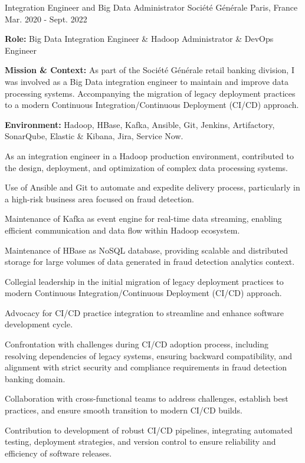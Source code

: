 \begin{cventries}
\cventry
{Integration Engineer and Big Data Administrator} %
{Société Générale} %
{Paris, France} %
{Mar. 2020 - Sept. 2022} %
{
  \begin{cvitems} %
    \item {\textbf{Role:} Big Data Integration Engineer \& Hadoop Administrator \& DevOps Engineer}
    \item {\textbf{Mission \& Context:} As part of the Société Générale retail banking division, I was involved as a Big Data integration engineer to maintain and improve data processing systems. Accompanying the migration of legacy deployment practices to a modern Continuous Integration/Continuous Deployment (CI/CD) approach.}
    \item {\textbf{Environment:} Hadoop, HBase, Kafka, Ansible, Git, Jenkins, Artifactory, SonarQube, Elastic \& Kibana, Jira, Service Now.}
    \item {As an integration engineer in a Hadoop production environment, contributed to the design, deployment, and optimization of complex data processing systems.}
    \item {Use of Ansible and Git to automate and expedite delivery process, particularly in a high-risk business area focused on fraud detection.}
    \item {Maintenance of Kafka as event engine for real-time data streaming, enabling efficient communication and data flow within Hadoop ecosystem.}
    \item {Maintenance of HBase as NoSQL database, providing scalable and distributed storage for large volumes of data generated in fraud detection analytics context.}
    \item {Collegial leadership in the initial migration of legacy deployment practices to modern Continuous Integration/Continuous Deployment (CI/CD) approach.}
    \item {Advocacy for CI/CD practice integration to streamline and enhance software development cycle.}
    \item {Confrontation with challenges during CI/CD adoption process, including resolving dependencies of legacy systems, ensuring backward compatibility, and alignment with strict security and compliance requirements in fraud detection banking domain.}
    \item {Collaboration with cross-functional teams to address challenges, establish best practices, and ensure smooth transition to modern CI/CD builds.}
    \item {Contribution to development of robust CI/CD pipelines, integrating automated testing, deployment strategies, and version control to ensure reliability and efficiency of software releases.}
  \end{cvitems}  
}


\end{cventries}
